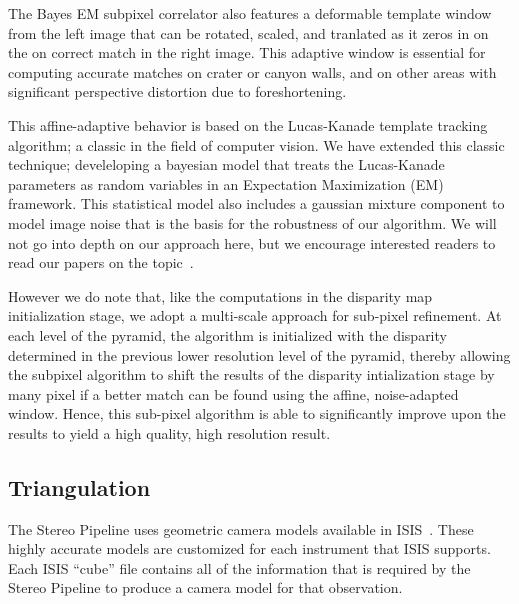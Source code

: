 The Bayes EM subpixel correlator also features a deformable template
window from the left image that can be rotated, scaled, and tranlated
as it zeros in on the on correct match in the right image.  This
adaptive window is essential for computing accurate matches on crater
or canyon walls, and on other areas with significant perspective
distortion due to foreshortening.  

This affine-adaptive behavior is based on the Lucas-Kanade template
tracking algorithm; a classic in the field of computer vision.  We
have extended this classic technique; develeloping a bayesian model
that treats the Lucas-Kanade parameters as random variables in an
Expectation Maximization (EM) framework.  This statistical model also
includes a gaussian mixture component to model image noise that is the
basis for the robustness of our algorithm.  We will not go into depth
on our approach here, but we encourage interested readers to read our
papers on the topic~\cite{nefian:bayes_em, broxton:isvc09}.

However we do note that, like the computations in the disparity map
initialization stage, we adopt a multi-scale approach for sub-pixel
refinement. At each level of the pyramid, the algorithm is initialized
with the disparity determined in the previous lower resolution level
of the pyramid, thereby allowing the subpixel algorithm to shift the
results of the disparity intialization stage by many pixel if a better
match can be found using the affine, noise-adapted window.  Hence,
this sub-pixel algorithm is able to significantly improve upon the
results to yield a high quality, high resolution result.

\subsection{Triangulation}



The Stereo Pipeline uses geometric camera models available in
ISIS~\cite{anderson08:isis}.  These highly accurate models are
customized for each instrument that ISIS supports.  Each ISIS ``cube''
file contains all of the information that is required by the Stereo
Pipeline to produce a camera model for that observation.

